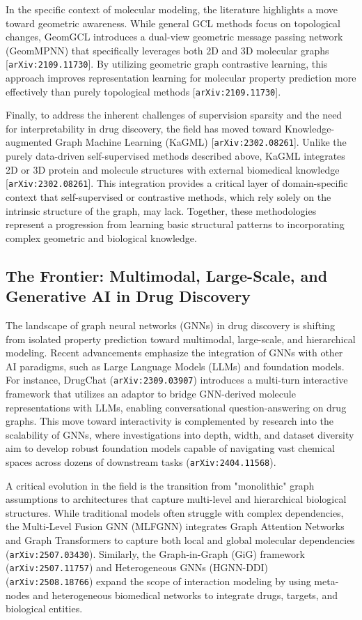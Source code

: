 \documentclass[11pt]{article}
\begin{document}
In the specific context of molecular modeling, the literature highlights a move toward geometric awareness. While general GCL methods focus on topological changes, GeomGCL introduces a dual-view geometric message passing network (GeomMPNN) that specifically leverages both 2D and 3D molecular graphs [\texttt{arXiv:2109.11730}]. By utilizing geometric graph contrastive learning, this approach improves representation learning for molecular property prediction more effectively than purely topological methods [\texttt{arXiv:2109.11730}].

Finally, to address the inherent challenges of supervision sparsity and the need for interpretability in drug discovery, the field has moved toward Knowledge-augmented Graph Machine Learning (KaGML) [\texttt{arXiv:2302.08261}]. Unlike the purely data-driven self-supervised methods described above, KaGML integrates 2D or 3D protein and molecule structures with external biomedical knowledge [\texttt{arXiv:2302.08261}]. This integration provides a critical layer of domain-specific context that self-supervised or contrastive methods, which rely solely on the intrinsic structure of the graph, may lack. Together, these methodologies represent a progression from learning basic structural patterns to incorporating complex geometric and biological knowledge.

\subsection{The Frontier: Multimodal, Large-Scale, and Generative AI in Drug Discovery}

The landscape of graph neural networks (GNNs) in drug discovery is shifting from isolated property prediction toward multimodal, large-scale, and hierarchical modeling. Recent advancements emphasize the integration of GNNs with other AI paradigms, such as Large Language Models (LLMs) and foundation models. For instance, DrugChat (\texttt{arXiv:2309.03907}) introduces a multi-turn interactive framework that utilizes an adaptor to bridge GNN-derived molecule representations with LLMs, enabling conversational question-answering on drug graphs. This move toward interactivity is complemented by research into the scalability of GNNs, where investigations into depth, width, and dataset diversity aim to develop robust foundation models capable of navigating vast chemical spaces across dozens of downstream tasks (\texttt{arXiv:2404.11568}).

A critical evolution in the field is the transition from "monolithic" graph assumptions to architectures that capture multi-level and hierarchical biological structures. While traditional models often struggle with complex dependencies, the Multi-Level Fusion GNN (MLFGNN) integrates Graph Attention Networks and Graph Transformers to capture both local and global molecular dependencies (\texttt{arXiv:2507.03430}). Similarly, the Graph-in-Graph (GiG) framework (\texttt{arXiv:2507.11757}) and Heterogeneous GNNs (HGNN-DDI) (\texttt{arXiv:2508.18766}) expand the scope of interaction modeling by using meta-nodes and heterogeneous biomedical networks to integrate drugs, targets, and biological entities.
\end{document}
